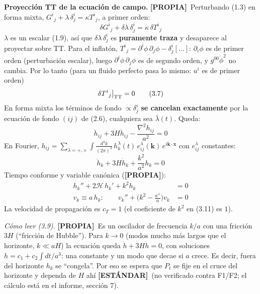 \documentclass[11pt,a4paper]{article}
\newcommand{\propia}{{\bfseries\color{TealBlue}[PROPIA]}}
\newcommand{\estandar}{{\bfseries\color{BurntOrange}[ESTÁNDAR]}}
\newcommand{\sub}[2]{\par\medskip\noindent{\bfseries\color{NavyBlue}#1}\quad\textbf{#2}}
\begin{document}
\sub{3.5}{Proyección TT de la ecuación de campo.} \propia\ Perturbando (1.3) en forma mixta, $G^i{}_j+\lambda\,\delta^i_j=\kappa T^i{}_j$, a primer orden:
\begin{equation}
\delta G^i{}_j+\delta\lambda\,\delta^i_j=\kappa\,\delta T^i{}_j\tag{3.6}
\end{equation}
$\lambda$ es un escalar (1.9), así que $\delta\lambda\,\delta^i_j$ es \textbf{puramente traza} y desaparece al proyectar sobre TT. Para el inflatón, $T^i{}_j=\partial^i\phi\,\partial_j\phi-\delta^i_j[\dots]$: $\partial_i\phi$ es de primer orden (perturbación escalar), luego $\partial^i\phi\,\partial_j\phi$ es de segundo orden, y $g^{00}\dot\phi^2$ no cambia. Por lo tanto (para un fluido perfecto pasa lo mismo: $u^i$ es de primer orden)
\begin{equation}
\delta T^i{}_j\big|_{\rm TT}=0\tag{3.7}
\end{equation}
En forma mixta los términos de fondo $\propto\delta^i_j$ \textbf{se cancelan exactamente} por la ecuación de fondo $(ij)$ de (2.6), cualquiera sea $\bar\lambda(t)$. Queda:
\begin{equation}
\boxed{\;\ddot h_{ij}+3H\dot h_{ij}-\frac{\nabla^2h_{ij}}{a^2}=0\;}\tag{3.8}
\end{equation}
En Fourier, $h_{ij}=\sum_{\lambda=+,\times}\int\!\frac{d^3k}{(2\pi)^3}\,h^\lambda_k(t)\,e^\lambda_{ij}(\mathbf k)\,e^{i\mathbf k\cdot\mathbf x}$ con $e^\lambda_{ij}$ constantes:
\begin{equation}
\boxed{\;\ddot h_k+3H\dot h_k+\frac{k^2}{a^2}h_k=0\;}\tag{3.9}
\end{equation}
Tiempo conforme y variable canónica (\propia):
\begin{align}
h_k''+2\mathcal H\,h_k'+k^2h_k&=0\tag{3.10}\\
v_k\equiv a\,h_k:\qquad v_k''+\Big(k^2-\frac{a''}a\Big)v_k&=0\tag{3.11}
\end{align}
La velocidad de propagación es $c_T=1$ (el coeficiente de $k^2$ en (3.11) es $1$).

\emph{Cómo leer (3.9).} \propia\ Es un oscilador de frecuencia $k/a$ con una fricción $3H$ (``fricción de Hubble''). Para $k\to0$ (modos mucho más largos que el horizonte, $k\ll aH$) la ecuación queda $\ddot h+3H\dot h=0$, con soluciones $h=c_1+c_2\int dt/a^3$: una constante y un modo que decae si $a$ crece. Es decir, fuera del horizonte $h_k$ se ``congela''. Por eso se espera que $P_t$ se fije en el cruce del horizonte y dependa de $H$ ahí \estandar\ (no verificado contra F1/F2; el cálculo está en el informe, sección 7).
\end{document}
